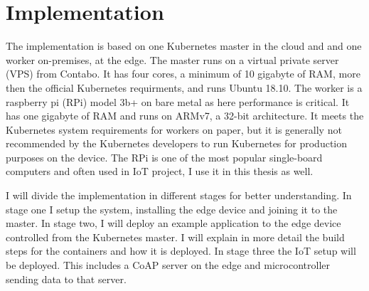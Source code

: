 \clearpage
\section{Implementation} \label{sec:implementation}
The implementation is based on one Kubernetes master in the cloud and and one worker on-premises, at the edge. The master runs on a virtual private server (VPS) from Contabo\cite{online:ContaboWebsite}. 
It has four cores, a minimum of 10 gigabyte of RAM, more then the official Kubernetes requirments\cite{kubernetesRequirementsInstall:online}, and runs Ubuntu 18.10. The worker is a raspberry pi (RPi) model 3b+ on bare metal as here performance is critical. It has one gigabyte of RAM and runs on ARMv7, a 32-bit architecture. It meets the Kubernetes system requirements for workers on paper, but it is generally not recommended by the Kubernetes developers to run Kubernetes for production purposes on the device. The RPi is one of the most popular single-board computers and often used in IoT project, I use it in this thesis as well.

I will divide the implementation in different stages for better understanding. In stage one I setup the system, installing the edge device and joining it to the master. In stage two, I will deploy an example application to the edge device controlled from the Kubernetes master. I will explain in more detail the build steps for the containers and how it is deployed. In stage three the IoT setup will be deployed. This includes a CoAP server on the edge and microcontroller sending data to that server. 











